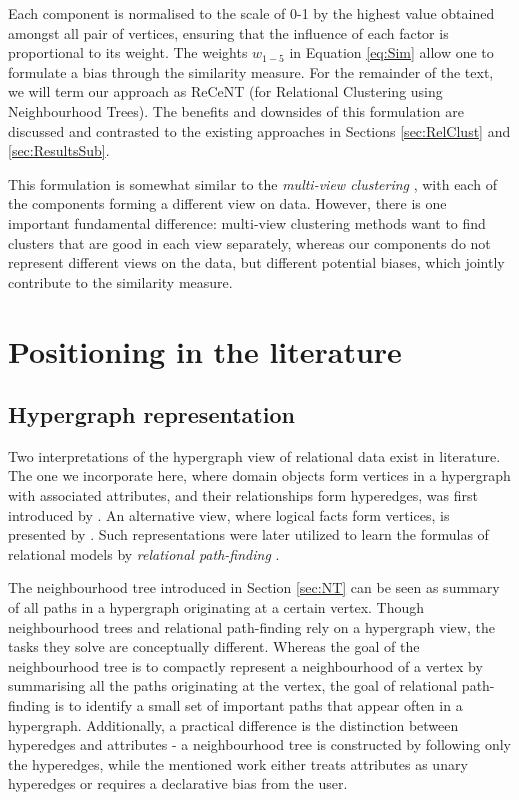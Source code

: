 Each component is normalised to the scale of 0-1 by the highest value obtained amongst all pair of vertices, ensuring that the influence of each factor is proportional to its weight.
The weights $w_{1-5}$ in Equation \ref{eq:Sim} allow one to formulate a bias through the similarity measure.
For the remainder of the text, we will term our approach as ReCeNT (for Relational Clustering using Neighbourhood Trees).
The benefits and downsides of this formulation are discussed and contrasted to the existing approaches in Sections \ref{sec:RelClust} and \ref{sec:ResultsSub}.


This formulation is somewhat similar to the \textit{multi-view clustering} \cite{Bickel:2004}, with each of the components forming a different view on data.
However, there is one important fundamental difference: multi-view clustering methods want to find clusters that are good in each view separately, whereas our components do not represent different views on the data, but different potential biases, which jointly contribute to the similarity measure.


\section{Positioning in the literature}


\subsection{Hypergraph representation}

Two interpretations of the hypergraph view of relational data exist in literature.
The one we incorporate here, where domain objects form vertices in a hypergraph with associated attributes, and their relationships form hyperedges, was first introduced by \cite{Richards:92AAb}.
An alternative view, where logical facts form vertices, is presented by \cite{Ong2005}.
Such representations were later utilized to learn the formulas of relational models by \textit{relational path-finding} \cite{kok2010motifs,Richards:92AAb,Ong2005,Lovasz1996}.



The neighbourhood tree introduced in Section \ref{sec:NT} can be seen as summary of all paths in a hypergraph originating at a certain vertex.
Though neighbourhood trees and relational path-finding rely on a hypergraph view, the tasks they solve are conceptually different.
Whereas the goal of the neighbourhood tree is to compactly represent a neighbourhood of a vertex by summarising all the paths originating at the vertex, the goal of relational path-finding is to identify a small set of important paths that appear often in a hypergraph.
Additionally, a practical difference is the distinction between hyperedges and attributes - a neighbourhood tree is constructed by following only the hyperedges, while the mentioned work either treats attributes as unary hyperedges or requires a declarative bias from the user.


